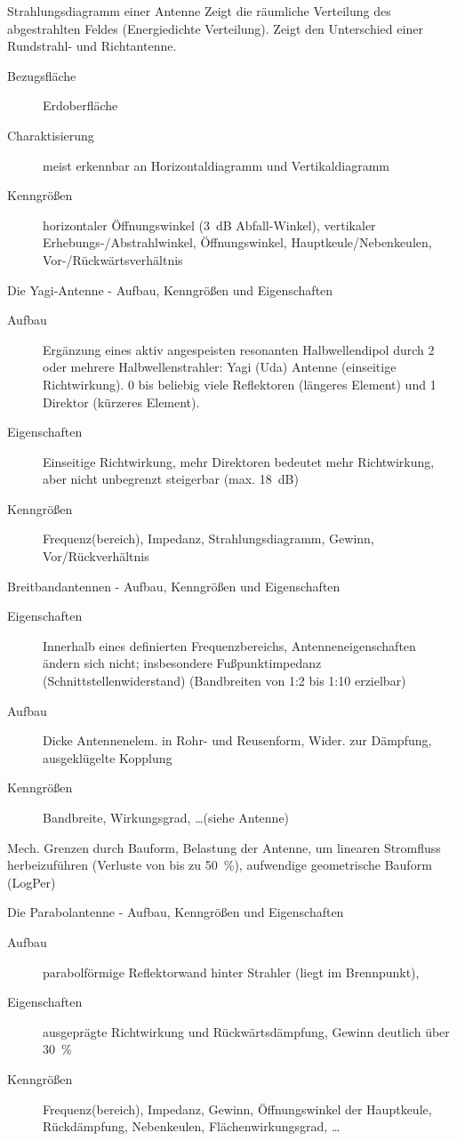 \documentclass[avery5371,grid,frame,a4paper]{flashcards}
\newcommand{\card}[3]{
  \begin{flashcard}[{\chap} -- #1]{#2}#3\end{flashcard}
}
\begin{document}
\card{67}{Strahlungsdiagramm einer Antenne}{
  \small
  Zeigt die räumliche Verteilung des abgestrahlten Feldes (Energiedichte Verteilung).
  Zeigt den Unterschied einer Rundstrahl- und Richtantenne.

  \begin{description}
    \item[Bezugsfläche] Erdoberfläche
    \item[Charaktisierung] meist erkennbar an Horizontaldiagramm und Vertikaldiagramm
    \item[Kenngrößen]
      horizontaler Öffnungswinkel (\SI{3}{\dB} Abfall-Winkel),
      vertikaler Erhebungs-/Abstrahlwinkel,
      Öffnungswinkel,
      Hauptkeule/Nebenkeulen,
      Vor-/Rückwärtsverhältnis
  \end{description}
}
\card{68}{Die Yagi-Antenne - Aufbau, Kenngrößen und Eigenschaften}{
  \small
  \begin{description}
    \item[Aufbau]
      Ergänzung eines aktiv angespeisten resonanten Halbwellendipol durch 2 oder mehrere Halbwellenstrahler: Yagi (Uda) Antenne (einseitige Richtwirkung). 0 bis beliebig viele Reflektoren (längeres Element) und 1 Direktor (kürzeres Element).
    \item[Eigenschaften]
      Einseitige Richtwirkung, mehr Direktoren bedeutet mehr Richtwirkung, aber nicht unbegrenzt steigerbar (max. \SI{18}{\dB})
  \item[Kenngrößen]
    Frequenz(bereich), Impedanz, Strahlungsdiagramm, Gewinn, Vor/Rückverhältnis
  \end{description}
}
\card{69}{Breitbandantennen - Aufbau, Kenngrößen und Eigenschaften}{
  \small
  \begin{description}
    \item[Eigenschaften]
      Innerhalb eines definierten Frequenzbereichs,
      Antenneneigenschaften ändern sich nicht;
      insbesondere Fußpunktimpedanz (Schnittstellenwiderstand)
      (Bandbreiten von 1:2 bis 1:10 erzielbar)
    \item[Aufbau]
      Dicke Antennenelem. in Rohr- und Reusenform, Wider. zur Dämpfung, ausgeklügelte Kopplung
    \item[Kenngrößen]
      Bandbreite, Wirkungsgrad, \dots {\tiny (siehe Antenne)}
  \end{description}
  Mech. Grenzen durch Bauform,
  Belastung der Antenne, um linearen Stromfluss herbeizuführen (Verluste von bis zu \SI{50}{\percent}),
  aufwendige geometrische Bauform (LogPer)
}
\card{70}{Die Parabolantenne - Aufbau, Kenngrößen und Eigenschaften}{
  \begin{description}
    \item[Aufbau]
      parabolförmige Reflektorwand hinter Strahler (liegt im Brennpunkt),
    \item[Eigenschaften]
      ausgeprägte Richtwirkung und Rückwärtsdämpfung,
      Gewinn deutlich über \SI{30}{\percent}
    \item[Kenngrößen]
      Frequenz(bereich), Impedanz, Gewinn, Öffnungswinkel der Hauptkeule,
      Rückdämpfung, Nebenkeulen, Flächenwirkungsgrad, \dots
  \end{description}
}
\end{document}
